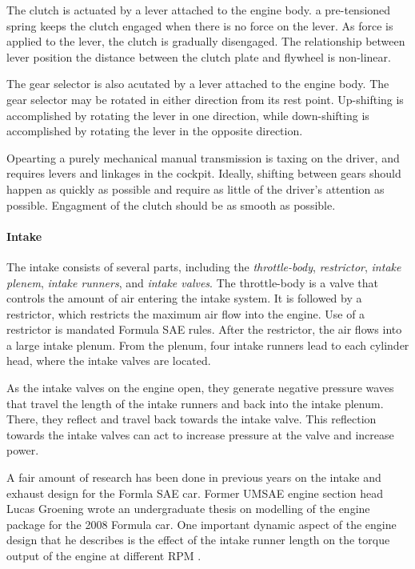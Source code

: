 The clutch is actuated by a lever attached to the engine body. a pre-tensioned spring keeps the clutch engaged when there is no force on the lever. As force is applied to the lever, the clutch is gradually disengaged. The relationship between lever position the distance between the clutch plate and flywheel is non-linear. 

The gear selector is also acutated by a lever attached to the engine body. The gear selector may be rotated in either direction from its rest point. Up-shifting is accomplished by rotating the lever in one direction, while down-shifting is accomplished by rotating the lever in the opposite direction. 

Opearting a purely mechanical manual transmission is taxing on the driver, and requires levers and linkages in the cockpit. Ideally, shifting between gears should happen as quickly as possible and require as little of the driver's attention as possible. Engagment of the clutch should be as smooth as possible. 

\paragraph{Intake}

The intake consists of several parts, including the \emph{throttle-body}, \emph{restrictor}, \emph{intake plenem}, \emph{intake runners}, and \emph{intake valves}. The throttle-body is a valve that controls the amount of air entering the intake system. It is followed by a restrictor, which restricts the maximum air flow into the engine. Use of a restrictor is mandated Formula SAE rules. After the restrictor, the air flows into a large intake plenum. From the plenum, four intake runners lead to each cylinder head, where the intake valves are located.

As the intake valves on the engine open, they generate negative pressure waves that travel the length of the intake runners and back into the intake plenum. There, they reflect and travel back towards the intake valve. This reflection towards the intake valves can act to increase pressure at the valve and increase power.

A fair amount of research has been done in previous years on the intake and exhaust design for the Formla SAE car. Former UMSAE engine section head Lucas Groening wrote an undergraduate thesis on modelling of the engine package for the 2008 Formula car. One important dynamic aspect of the engine design that he describes is the effect of the intake runner length on the torque output of the engine at different RPM \cite{Modelingof20}. 

